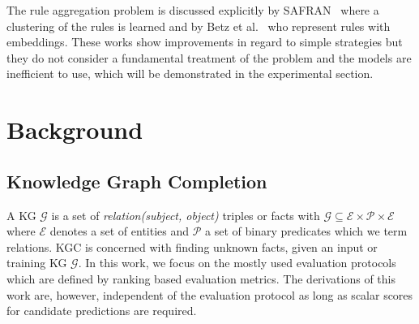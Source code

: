 \documentclass{article}
\theoremstyle{plain}
\theoremstyle{remark}
\newcommand{\alltriples}{\mathcal{G}}
\begin{document}
The rule aggregation problem is discussed explicitly by SAFRAN~\cite{ott2021safran} where a clustering of the rules is learned and by Betz et al.~ who represent rules with embeddings. These works show improvements in regard to simple strategies but they do not consider a fundamental treatment of the problem and the models are inefficient to use, which will be demonstrated in the experimental section.

\section{Background} \label{sec: prelim}


\subsection{Knowledge Graph Completion}\label{sec: KGC}
A KG $\alltriples$ is a set of \textit{relation(subject, object)} triples or facts with $\alltriples \subseteq \mathcal{E} \times \mathcal{P} \times \mathcal{E}$ where $\mathcal{E}$ denotes a set of entities and $\mathcal{P}$ a set of binary predicates which we term relations. KGC is concerned with finding unknown facts, given an input or training KG $\alltriples$. In this work, we focus on the mostly used evaluation protocols which are defined by ranking based evaluation metrics. The derivations of this work are, however, independent of the evaluation protocol as long as scalar scores for candidate predictions are required.
\end{document}
